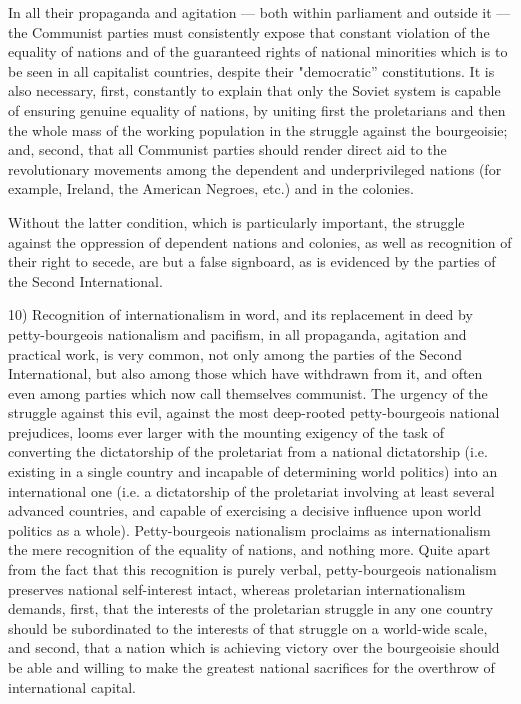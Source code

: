 In all their propaganda and agitation — both within parliament and outside it — the Communist parties must consistently expose that constant violation of the equality of nations and of the guaranteed rights of national minorities which is to be seen in all capitalist countries, despite their "democratic” constitutions. It is also necessary, first, constantly to explain that only the Soviet system is capable of ensuring genuine equality of nations, by uniting first the proletarians and then the whole mass of the working population in the struggle against the bourgeoisie; and, second, that all Communist parties should render direct aid to the revolutionary movements among the dependent and underprivileged nations (for example, Ireland, the American Negroes, etc.) and in the colonies. 

Without the latter condition, which is particularly important, the struggle against the oppression of dependent nations and colonies, as well as recognition of their right to secede, are but a false signboard, as is evidenced by the parties of the Second International. 

10) Recognition of internationalism in word, and its replacement in deed by petty-bourgeois nationalism and pacifism, in all propaganda, agitation and practical work, is very common, not only among the parties of the Second International, but also among those which have withdrawn from it, and often even among parties which now call themselves communist. The urgency of the struggle against this evil, against the most deep-rooted petty-bourgeois national prejudices, looms ever larger with the mounting exigency of the task of converting the dictatorship of the proletariat from a national dictatorship (i.e. existing in a single country and incapable of determining world politics) into an international one (i.e. a dictatorship of the proletariat involving at least several advanced countries, and capable 
of exercising a decisive influence upon world politics as a whole). Petty-bourgeois nationalism proclaims as internationalism the mere recognition of the equality of nations, and nothing more. Quite apart from the fact that this recognition is purely verbal, petty-bourgeois nationalism preserves national self-interest intact, whereas proletarian internationalism demands, first, that the interests of the proletarian struggle in any one country should be subordinated to the interests of that struggle on a world-wide scale, and second, that a nation which is achieving victory over the bourgeoisie should be able and willing to make the greatest national sacrifices for the overthrow of international 
capital. 

